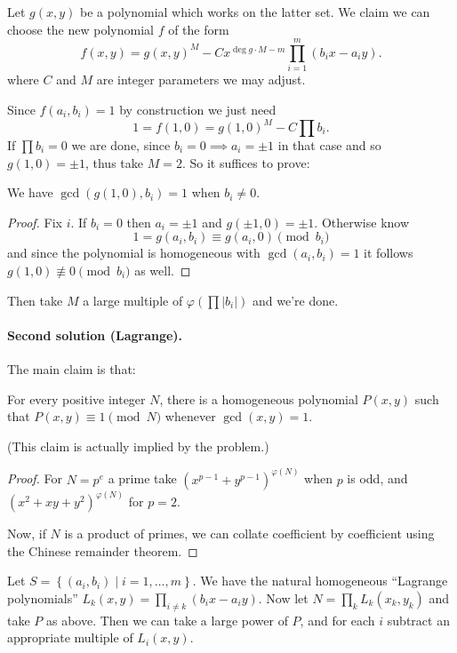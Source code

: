 \documentclass[11pt]{scrartcl}
\begin{document}
Let $g(x,y)$ be a polynomial which works on the latter set.
We claim we can choose the new polynomial $f$ of the form
\[ f(x,y) = g(x,y)^{M} - C x^{\deg g \cdot M-m} \prod_{i=1}^m (b_i x - a_i y). \]
where $C$ and $M$ are integer parameters we may adjust.

Since $f(a_i, b_i) = 1$ by construction we just need
\[ 1 = f(1,0) = g(1,0)^M - C \prod b_i. \]
If $\prod b_i = 0$ we are done,
since $b_i = 0 \implies a_i = \pm 1$ in that case
and so $g(1, 0) = \pm 1$, thus take $M = 2$.
So it suffices to prove:
\begin{claim*}
  We have $\gcd\left( g(1,0), b_i \right) = 1$ when $b_i \neq 0$.
\end{claim*}
\begin{proof}
  Fix $i$. If $b_i = 0$ then $a_i = \pm 1$ and $g(\pm 1,0) = \pm 1$.
  Otherwise know
  \[ 1 = g(a_i, b_i) \equiv g(a_i, 0) \pmod{b_i} \]
  and since the polynomial is homogeneous with $\gcd(a_i, b_i) = 1$
  it follows $g(1,0) \not\equiv 0 \pmod{b_i}$ as well.
\end{proof}
Then take $M$ a large multiple of $\varphi(\prod |b_i|)$ and we're done.

\paragraph{Second solution (Lagrange).}
The main claim is that:
\begin{claim*}
  For every positive integer $N$,
  there is a homogeneous polynomial $P(x,y)$ such that
  $P(x,y) \equiv 1 \pmod N$ whenever $\gcd(x,y) = 1$.
\end{claim*}
(This claim is actually implied by the problem.)
\begin{proof}
  For $N = p^e$ a prime take $(x^{p-1} + y^{p-1})^{\varphi(N)}$
  when $p$ is odd, and $(x^2+xy+y^2)^{\varphi(N)}$ for $p=2$.

  Now, if $N$ is a product of primes,
  we can collate coefficient by coefficient using the
  Chinese remainder theorem.
\end{proof}

Let $S = \left\{ (a_i, b_i) \mid i=1, \dots, m \right\}$.
We have the natural homogeneous ``Lagrange polynomials''
$L_k(x,y) = \prod_{i \neq k} (b_i x - a_i y)$.
Now let $N = \prod_k L_k(x_k, y_k)$ and take $P$ as above.
Then we can take a large power of $P$,
and for each $i$ subtract an appropriate multiple of $L_i(x,y)$.
\pagebreak
\end{document}
